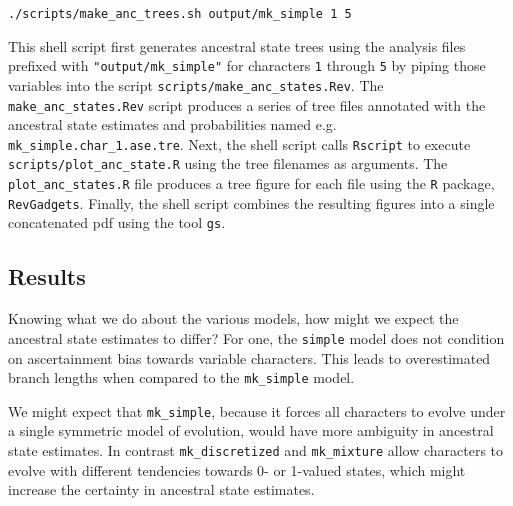 {\tt \begin{snugshade*}
\begin{lstlisting}
./scripts/make_anc_trees.sh output/mk_simple 1 5
\end{lstlisting}
\end{snugshade*}}

This shell script first generates ancestral state trees using the analysis files prefixed with {\tt "output/mk\_simple"} for characters {\tt 1} through {\tt 5} by piping those variables into the \RevBayes script {\tt scripts/make\_anc\_states.Rev}.
The {\tt make\_anc\_states.Rev} script produces a series of tree files annotated with the ancestral state estimates and probabilities named e.g. {\tt mk\_simple.char\_1.ase.tre}.
Next, the shell script calls {\tt Rscript} to execute {\tt scripts/plot\_anc\_state.R} using the tree filenames as arguments.
The {\tt plot\_anc\_states.R} file produces a tree figure for each file using the {\tt R} package, {\tt RevGadgets}.
Finally, the shell script combines the resulting figures into a single concatenated pdf using the tool {\tt gs}.

\subsection{Results}

Knowing what we do about the various models, how might we expect the ancestral state estimates to differ?
For one, the {\tt simple} model does not condition on ascertainment bias towards variable characters.
This leads to overestimated branch lengths when compared to the {\tt mk\_simple} model.

We might expect that {\tt mk\_simple}, because it forces all characters to evolve under a single symmetric model of evolution, would have more ambiguity in ancestral state estimates.
In contrast {\tt mk\_discretized} and {\tt mk\_mixture} allow characters to evolve with different tendencies towards 0- or 1-valued states, which might increase the certainty in ancestral state estimates.


\newpage
